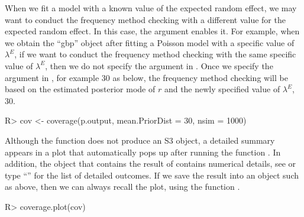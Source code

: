 \documentclass[article]{jss}
\begin{document}
When we fit a model with a known value of the expected random effect, we may want to conduct the frequency method checking with a different value for the expected random effect. In this case, the argument  enables it. For example, when we obtain the ``gbp'' object    after fitting a Poisson model with a specific value of  $\lambda^E$, if we want to conduct the frequency method checking with the same specific value of  $\lambda^E$, then we do not specify the argument  in . Once we specify the argument  in , for example 30 as below, the frequency method checking will be based on the estimated posterior mode of $r$ and the newly specified value of $\lambda^E$, 30.
\begin{CodeChunk}
\begin{CodeInput}
R> cov <- coverage(p.output, mean.PriorDist = 30, nsim = 1000)
\end{CodeInput}
\end{CodeChunk}

Although the function  does not produce an S3 object, a detailed summary appears in a plot that automatically pops up after running the function . In addition, the object  that contains the result of  contains numerical details, see  or type ``'' for the list of detailed outcomes. If we save the result into an object such as  above, then we can always recall the plot, using the function .
\begin{CodeChunk}
\begin{CodeInput}
R> coverage.plot(cov)
\end{CodeInput}
\end{CodeChunk}



\end{document}
